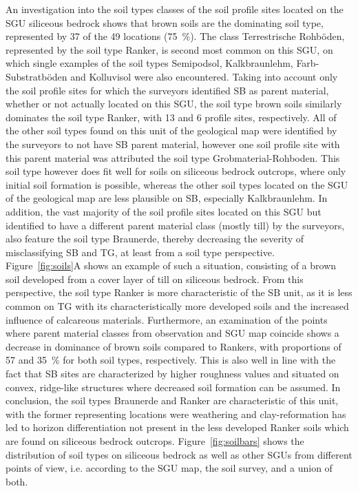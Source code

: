 \documentclass[preprint,12pt,authoryear]{elsarticle}
\begin{document}
An investigation into the soil types classes of the soil profile sites located on the SGU siliceous bedrock shows that brown soils are the dominating soil type, represented by 37 of the 49 locations (75~\%). The class Terrestrische Rohb\"oden, represented by the soil type Ranker, is second most common on this SGU, on which single examples of the soil types Semipodsol, Kalkbraunlehm, Farb-Substratb\"oden and Kolluvisol were also encountered. Taking into account only the soil profile sites for which the surveyors identified SB as parent material, whether or not actually located on this SGU, the soil type brown soils similarly dominates the soil type Ranker, with 13 and 6 profile sites, respectively. All of the other soil types found on this unit of the geological map were identified by the surveyors to not have SB parent material, however one soil profile site with this parent material was attributed the soil type Grobmaterial-Rohboden. This soil type however does fit well for soils on siliceous bedrock outcrops, where only initial soil formation is possible, whereas the other soil types located on the SGU of the geological map are less plausible on SB, especially Kalkbraunlehm. In addition, the vast majority of the soil profile sites located on this SGU but identified to have a different parent material class (mostly till) by the surveyors, also feature the soil type Braunerde, thereby decreasing the severity of misclassifying SB and TG, at least from a soil type perspective. Figure~\ref{fig:soils}A shows an example of such a situation, consisting of a brown soil developed from a cover layer of till on siliceous bedrock. From this perspective, the soil type Ranker is more characteristic of the SB unit, as it is less common on TG with its characteristically more developed soils and the increased influence of  calcareous materials. Furthermore, an examination of the points where parent material classes from observation and SGU map coincide shows a decrease in dominance of brown soils compared to Rankers, with proportions of 57 and 35~\% for both soil types, respectively. This is also well in line with the fact that SB sites are characterized by higher roughness values and situated on convex, ridge-like structures where decreased soil formation can be assumed. In conclusion, the soil types Braunerde and Ranker are characteristic of this unit, with the former representing locations were weathering and clay-reformation has led to horizon differentiation not present in the less developed Ranker soils which are found on siliceous bedrock outcrops. Figure~\ref{fig:soilbars} shows the distribution of soil types on siliceous bedrock as well as other SGUs from different points of view, i.e. according to the SGU map, the soil survey, and a union of both. 
\end{document}
